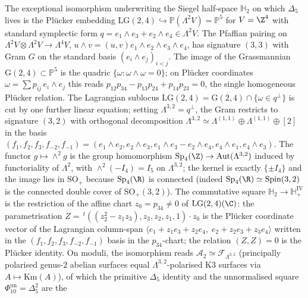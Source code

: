 \begin{remark}[Pl\"ucker origin of \texorpdfstring{$\mathrm{Sp}_4(\Z)/\{\pm I_4\}\simeq\mathrm{SO}_+(\Lambda^{3,2})$}{Sp-4(Z)/pm I-4 =SO-+(Lambda-3,2)}]
\label{rem:qgfnd-plucker-lg24}
The exceptional isomorphism underwriting the Siegel half-space
$\mathbb H_2$ on which $\Delta_5$ lives is the Pl\"ucker embedding
$\mathrm{LG}(2,4)\hookrightarrow\mathbb P(\Lambda^2 V)=\mathbb P^5$ for
$V=\Z^4$ with standard symplectic form
$q=e_1\wedge e_3+e_2\wedge e_4\in\Lambda^2 V$. The Pfaffian pairing on
$\Lambda^2 V\otimes\Lambda^2 V\to\Lambda^4 V$, $u\wedge v=(u,v)e_1\wedge
e_2\wedge e_3\wedge e_4$, has signature $(3,3)$ with Gram $G$ on the
standard basis $(e_i\wedge e_j)_{i<j}$. The image of the Grassmannian
$\mathrm{G}(2,4)\subset\mathbb P^5$ is the quadric
$\{\omega:\omega\wedge\omega=0\}$; on Pl\"ucker coordinates
$\omega=\sum p_{ij}\,e_i\wedge e_j$ this reads
$p_{12}p_{34}-p_{13}p_{24}+p_{14}p_{23}=0$, the single homogeneous
Pl\"ucker relation. The Lagrangian sublocus
$\mathrm{LG}(2,4)=\mathrm{G}(2,4)\cap\{\omega\in q^\perp\}$ is cut by one
further linear equation; setting $\Lambda^{3,2}=q^\perp$, the Gram
restricts to signature $(3,2)$ with orthogonal decomposition
$\Lambda^{3,2}\simeq\Lambda^{(1,1)}\oplus\Lambda^{(1,1)}\oplus[2]$ in
the basis $(f_1,f_2,f_3,f_{-2},f_{-1})=(e_1\wedge e_2,e_2\wedge
e_3,e_1\wedge e_3-e_2\wedge e_4,e_4\wedge e_1,e_4\wedge e_3)$.
The functor $g\mapsto\wedge^2 g$ is the group homomorphism
$\mathrm{Sp}_4(\Z)\to\mathrm{Aut}(\Lambda^{3,2})$ induced by
functoriality of $\Lambda^2$, with $\wedge^2(-I_4)=I_5$ on $\Lambda^{3,2}$;
the kernel is exactly $\{\pm I_4\}$ and the image lies in $\mathrm{SO}_+$
because $\mathrm{Sp}_4(\R)$ is connected (indeed $\mathrm{Sp}_4(\R)\simeq
\mathrm{Spin}(3,2)$ is the connected double cover of
$\mathrm{SO}_+(3,2)$). The commutative square
$\mathbb H_2\to\mathbb H^{\mathrm{IV}}_+$ is the restriction of the
affine chart $z_0=p_{34}\neq 0$ of $\mathrm{LG}(2,4)(\C)$: the
parametrisation
$Z=\,^t\!((z_2^2-z_1z_3),z_3,z_2,z_1,1)\cdot z_0$ is the Pl\"ucker
coordinate vector of the Lagrangian column-span
$\bigl\langle e_1+z_1 e_3+z_2 e_4,\;e_2+z_2 e_3+z_3 e_4\bigr\rangle$
written in the $(f_1,f_2,f_3,f_{-2},f_{-1})$ basis in the $p_{34}$-chart;
the relation $(Z,Z)=0$ is the Pl\"ucker identity. On moduli, the
isomorphism reads $\mathcal A_2\simeq\mathcal F_{\Lambda^{3,2}}$
(principally polarised genus-$2$ abelian surfaces equal
$\Lambda^{3,2}$-polarised K3 surfaces via $A\mapsto\mathrm{Km}(A)$), of
which the primitive $\Delta_5$ identity and the unnormalised square
$\Phi_{10}^{\mathrm{un}}=\Delta_5^2$ are the

\end{remark}
